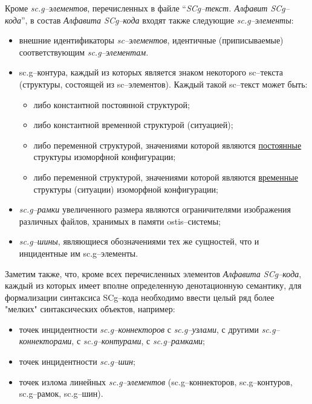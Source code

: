 Кроме\textit{ sc.g--элементов}, перечисленных в файле ``\textit{SCg--текст. Алфавит SCg--кода}'', в состав \textit{Алфавита SCg--кода} входят также следующие \textit{sc.g--элементы}:
\begin{itemize}
	\item внешние идентификаторы \textit{sc--элементов}, идентичные (приписываемые) соответствующим \textit{sc.g--элементам}.
	\item sc.g--контура, каждый из которых является знаком некоторого sc--текста (структуры, состоящей из sc--элементов). Каждый такой sc--текст может быть:
	\begin{itemize}
		\item либо константной постоянной структурой;
		\item либо константной временной структурой (ситуацией);
		\item либо переменной структурой, значениями которой являются \uline{постоянные} структуры изоморфной  конфигурации;
		\item либо переменной структурой, значениями которой являются \uline{временные} структуры (ситуации) изоморфной  конфигурации;
	\end{itemize}
	
	\item \textit{sc.g--рамки} увеличенного размера являются ограничителями изображения различных файлов, хранимых в памяти ostis--системы;
	\item \textit{sc.g--шины}, являющиеся обозначениями тех же сущностей, что и инцидентные им sc.g--элементы.
\end{itemize}

Заметим также, что, кроме всех перечисленных элементов \textit{Алфавита SCg--кода}, каждый из которых имеет вполне определенную денотационную  семантику, для формализации синтаксиса SCg--кода необходимо ввести целый ряд более "мелких"{} синтаксических объектов, например:
\begin{itemize}
	\item точек инцидентности \textit{sc.g--коннекторов} с \textit{sc.g--узлами}, с другими \textit{sc.g--коннекторами}, с \textit{sc.g--контурами}, с \textit{sc.g--рамками};
	\item точек инцидентности \textit{sc.g--шин};
	\item точек излома линейных \textit{sc.g--элементов} (sc.g--коннекторов, sc.g--контуров, sc.g--рамок, sc.g--шин).
\end{itemize}

\newpage

